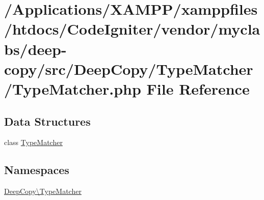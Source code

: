 \hypertarget{_type_matcher_8php}{}\section{/\+Applications/\+X\+A\+M\+P\+P/xamppfiles/htdocs/\+Code\+Igniter/vendor/myclabs/deep-\/copy/src/\+Deep\+Copy/\+Type\+Matcher/\+Type\+Matcher.php File Reference}
\label{_type_matcher_8php}
\subsection*{Data Structures}
\begin{DoxyCompactItemize}
\item 
class \mbox{\hyperlink{class_deep_copy_1_1_type_matcher_1_1_type_matcher}{Type\+Matcher}}
\end{DoxyCompactItemize}
\subsection*{Namespaces}
\begin{DoxyCompactItemize}
\item 
 \mbox{\hyperlink{namespace_deep_copy_1_1_type_matcher}{Deep\+Copy\textbackslash{}\+Type\+Matcher}}
\end{DoxyCompactItemize}
